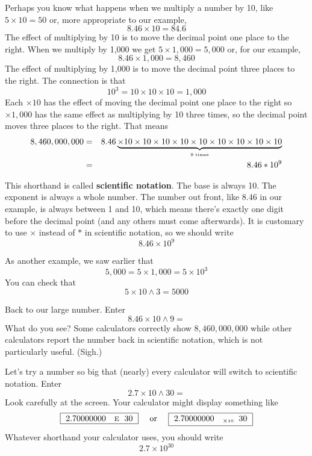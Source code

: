  Perhaps you know what happens when we multiply a number by 10, like
$ 5 \times 10 = 50$ or, more appropriate to our example, $$ 8.46 \times 10 = 84.6$$
The effect of multiplying by 10 is to move the decimal point one place to the right.
When we multiply by 1,000 we get
$ 5 \times 1,000 = 5,000 $ or, for our example, $$8.46 \times 1,000 = 8,460$$
The effect of multiplying by 1,000 is to move the decimal point three places to the right.
The connection is that $$10^3=10 \times 10 \times 10  =1,000$$
Each $\times 10$ has the effect of moving the decimal point one place to the right so $\times 1,000$ has the same effect as multiplying by 10 three times, so the decimal point moves three places to the right.
That means 
\begin{eqnarray*}
8,460,000,000 & = & 8.46 \underbrace{\hbox{$\times 10 \times 10  \times 10  \times 10  \times 10  \times 10  \times 10  \times 10  \times 10 $}}_{\hbox{\begin{tiny} 9 times \end{tiny}}}  \\  %
& = & 8.46 \ast 10^ 9 \\  
\end{eqnarray*} 
\vspace{-.5in} %

This shorthand is called \textbf{scientific notation}.  The base is always 10.  The exponent is always a whole number.  The number out front, like 8.46 in our example, is always between 1 and 10, which means there's exactly one digit before the decimal point (and any others must come afterwards).  It is customary to use $\times$ instead of $\ast$ in scientific notation, so we should write
$$8.46\times10^9$$

As another example, we saw earlier that $$5,000 = 5 \times 1,000 = 5 \times 10^3$$
You can check that  $$5 \times 10 \wedge 3 = 5000$$
 
Back to our large number.  Enter $$8.46 \times 10 \wedge 9=$$
What do you see?  Some calculators correctly show $8,460,000,000$ while other calculators report the number back in scientific notation, which is not particularly useful. (Sigh.)  

Let's try a number so big that (nearly) every calculator will switch to scientific notation.  Enter $$2.7\times 10 \wedge 30=$$
Look carefully at the screen.  Your calculator might display something like 
$$\boxed{~2.70000000 \quad \text{\begin{footnotesize}E \end{footnotesize}}~30~} \text{ \quad or \quad } \boxed{~2.70000000 \quad _{ \times \text{\begin{tiny}10 \end{tiny}}}~30~}$$ 
Whatever shorthand your calculator uses, you should write $$2.7 \times 10^{30}$$

